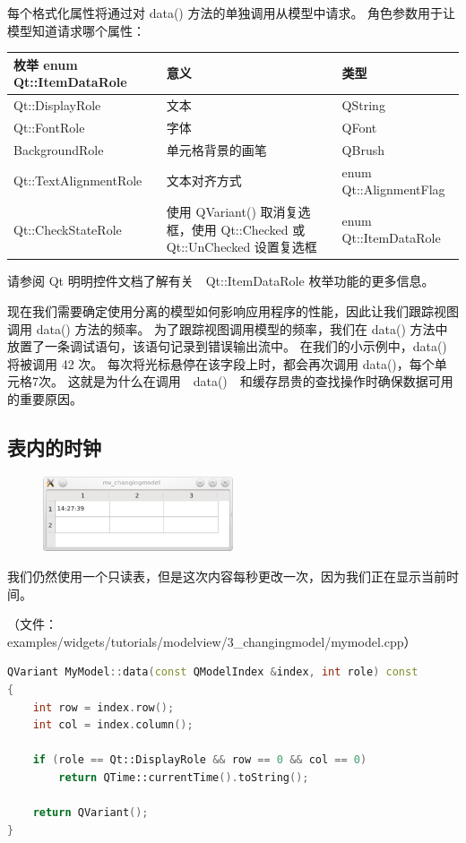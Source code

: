 每个格式化属性将通过对 data() 方法的单独调用从模型中请求。
角色参数用于让模型知道请求哪个属性：

\begin{tabular}{|l|m{15em}|l|}
	\hline
	枚举 enum Qt::ItemDataRole & 意义 &类型 \\
	\hline
	Qt::DisplayRole	 & 文本	 &QString \\
	\hline
	Qt::FontRole	& 字体	&QFont\\ 
	\hline
	BackgroundRole &	单元格背景的画笔	& QBrush\\ 
	\hline
	Qt::TextAlignmentRole	& 文本对齐方式 &enum Qt::AlignmentFlag \\
	\hline 
	Qt::CheckStateRole &	使用 QVariant() 取消复选框，使用 Qt::Checked 或 Qt::UnChecked 设置复选框 &	enum Qt::ItemDataRole \\
	\hline
\end{tabular}

请参阅 Qt 明明控件文档了解有关　Qt::ItemDataRole 枚举功能的更多信息。

现在我们需要确定使用分离的模型如何影响应用程序的性能，因此让我们跟踪视图调用 data() 方法的频率。
为了跟踪视图调用模型的频率，我们在 data() 方法中放置了一条调试语句，该语句记录到错误输出流中。
在我们的小示例中，data() 将被调用 42 次。
每次将光标悬停在该字段上时，都会再次调用 data()，每个单元格7次。
这就是为什么在调用　data()　和缓存昂贵的查找操作时确保数据可用的重要原因。

\subsection{表内的时钟}

\begin{figure}[hbt!]  
\includegraphics[width=0.5\textwidth]{img/clock}
\end{figure}

我们仍然使用一个只读表，但是这次内容每秒更改一次，因为我们正在显示当前时间。

（文件：examples/widgets/tutorials/modelview/3\_changingmodel/mymodel.cpp）

\begin{lstlisting}[language=C++]
QVariant MyModel::data(const QModelIndex &index, int role) const
{
    int row = index.row();
    int col = index.column();

    if (role == Qt::DisplayRole && row == 0 && col == 0)
        return QTime::currentTime().toString();

    return QVariant();
}
\end{lstlisting}


